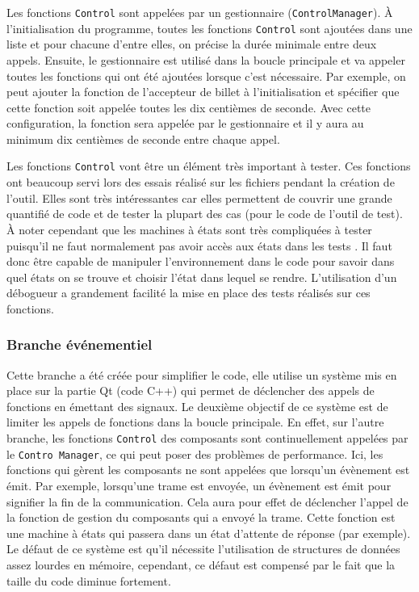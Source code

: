 \documentclass[a4paper]{article}
\begin{document}
Les fonctions \verb|Control| sont appelées par un gestionnaire
(\verb|ControlManager|). À l'initialisation du programme, toutes les fonctions
\verb|Control| sont ajoutées dans une liste et pour chacune d'entre elles, on
précise la durée minimale entre deux appels. Ensuite, le gestionnaire est
utilisé dans la boucle principale et va appeler toutes les fonctions qui ont été
ajoutées lorsque c'est nécessaire. Par exemple, on peut ajouter la fonction de
l'accepteur de billet à l'initialisation et spécifier que cette fonction soit
appelée toutes les dix centièmes de seconde. Avec cette configuration, la
fonction sera appelée par le gestionnaire et il y aura au minimum dix centièmes
de seconde entre chaque appel.

Les fonctions \verb|Control| vont être un élément très important à tester. Ces
fonctions ont beaucoup servi lors des essais réalisé sur les fichiers pendant la
création de l'outil. Elles sont très intéressantes car elles permettent de
couvrir une grande quantifié de code et de tester la plupart des cas (pour le
code de l'outil de test). À noter cependant que les machines à états sont très
compliquées à tester puisqu'il ne faut normalement pas avoir accès aux états
dans les tests \cite{teststatemachines}. Il faut donc être capable de manipuler
l'environnement dans le code pour savoir dans quel états on se trouve et choisir
l'état dans lequel se rendre. L'utilisation d'un débogueur a grandement facilité
la mise en place des tests réalisés sur ces fonctions.

\subsubsection{Branche événementiel}
\label{brancheevent}

Cette branche a été créée pour simplifier le code, elle utilise un système mis
en place sur la partie Qt (code C++) qui  permet de déclencher des appels de
fonctions en émettant des signaux. Le deuxième objectif de ce système est de
limiter les appels de fonctions dans la boucle principale. En effet, sur l'autre
branche, les fonctions \verb|Control| des composants sont continuellement
appelées par le \verb|Contro Manager|, ce qui peut poser des problèmes de
performance. Ici, les fonctions qui gèrent les composants ne sont appelées que
lorsqu'un évènement est émit. Par exemple, lorsqu'une trame est envoyée, un
évènement est émit pour signifier la fin de la communication. Cela aura pour
effet de déclencher l'appel de la fonction de gestion du composants qui a envoyé
la trame. Cette fonction est une machine à états qui passera dans un état
d'attente de réponse (par exemple). Le défaut de ce système est qu'il nécessite
l'utilisation de structures de données assez lourdes en mémoire, cependant, ce
défaut est compensé par le fait que la taille du code diminue fortement.
\end{document}
